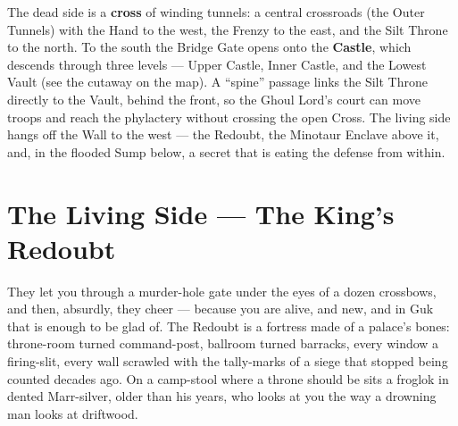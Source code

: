 \documentclass[10pt,twoside]{report}
\begin{document}
\begin{center}
\end{center}
\noindent The dead side is a \textbf{cross} of winding tunnels: a central crossroads (the Outer Tunnels) with the Hand to the west, the Frenzy to the east, and the Silt Throne to the north. To the south the Bridge Gate opens onto the \textbf{Castle}, which descends through three levels --- Upper Castle, Inner Castle, and the Lowest Vault (see the cutaway on the map). A ``spine'' passage links the Silt Throne directly to the Vault, behind the front, so the Ghoul Lord's court can move troops and reach the phylactery without crossing the open Cross. The living side hangs off the Wall to the west --- the Redoubt, the Minotaur Enclave above it, and, in the flooded Sump below, a secret that is eating the defense from within.

\section{The Living Side --- The King's Redoubt}
\begin{readaloud}
They let you through a murder-hole gate under the eyes of a dozen crossbows, and then, absurdly, they cheer --- because you are alive, and new, and in Guk that is enough to be glad of. The Redoubt is a fortress made of a palace's bones: throne-room turned command-post, ballroom turned barracks, every window a firing-slit, every wall scrawled with the tally-marks of a siege that stopped being counted decades ago. On a camp-stool where a throne should be sits a froglok in dented Marr-silver, older than his years, who looks at you the way a drowning man looks at driftwood.
\end{readaloud}
\end{document}
